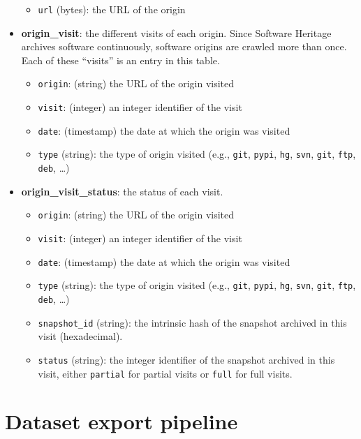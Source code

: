 \begin{itemize}
  \begin{itemize}
  \tightlist
  \item
    \texttt{url} (bytes): the URL of the origin
  \end{itemize}
\item
  \textbf{origin\_visit}: the different visits of each origin. Since
  Software Heritage archives software continuously, software origins are
  crawled more than once. Each of these ``visits'' is an entry in this
  table.

  \begin{itemize}
  \tightlist
  \item
    \texttt{origin}: (string) the URL of the origin visited
  \item
    \texttt{visit}: (integer) an integer identifier of the visit
  \item
    \texttt{date}: (timestamp) the date at which the origin was visited
  \item
    \texttt{type} (string): the type of origin visited (e.g.,
    \texttt{git}, \texttt{pypi}, \texttt{hg}, \texttt{svn},
    \texttt{git}, \texttt{ftp}, \texttt{deb}, \ldots)
  \end{itemize}
\item
  \textbf{origin\_visit\_status}: the status of each visit.

  \begin{itemize}
  \tightlist
  \item
    \texttt{origin}: (string) the URL of the origin visited
  \item
    \texttt{visit}: (integer) an integer identifier of the visit
  \item
    \texttt{date}: (timestamp) the date at which the origin was visited
  \item
    \texttt{type} (string): the type of origin visited (e.g.,
    \texttt{git}, \texttt{pypi}, \texttt{hg}, \texttt{svn},
    \texttt{git}, \texttt{ftp}, \texttt{deb}, \ldots)
  \item
    \texttt{snapshot\_id} (string): the intrinsic hash of the snapshot
    archived in this visit (hexadecimal).
  \item
    \texttt{status} (string): the integer identifier of the snapshot
    archived in this visit, either \texttt{partial} for partial visits
    or \texttt{full} for full visits.
  \end{itemize}
\end{itemize}


\section{Dataset export pipeline}

